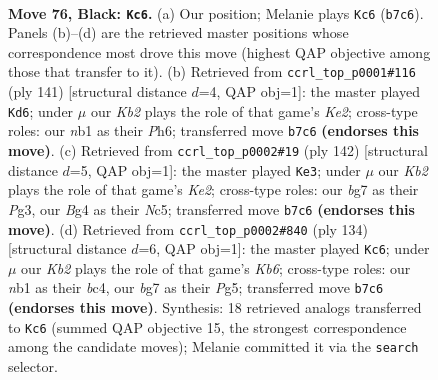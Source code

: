 \documentclass[11pt]{article}
\begin{document}
\clearpage

\begin{figure}[p]\centering
\begin{subfigure}{0.46\textwidth}\centering
\resizebox{\linewidth}{!}{%
\newchessgame
\chessboard[
  setfen={8/1k4B1/8/8/p1p3b1/8/5K2/1N6 b - - 7 76},
  showmover=false,
  pgfstyle=straightmove, color=movearrow, markmove={b7-c6}
]}
\caption{}
\end{subfigure}\hfill
\begin{subfigure}{0.46\textwidth}\centering
\resizebox{\linewidth}{!}{%
\newchessgame
\chessboard[
  setfen={8/4k3/7p/7P/1p2K3/1B6/1b6/8 b - - 0 71},
  showmover=false,
  pgfstyle=straightmove, color=movearrow, markmove={e7-d6}
]}
\caption{}
\end{subfigure}
\\[4pt]
\begin{subfigure}{0.46\textwidth}\centering
\resizebox{\linewidth}{!}{%
\newchessgame
\chessboard[
  setfen={7n/7P/5k2/2N5/6p1/6P1/4K3/8 w - - 11 72},
  showmover=false,
  pgfstyle=straightmove, color=movearrow, markmove={e2-e3}
]}
\caption{}
\end{subfigure}\hfill
\begin{subfigure}{0.46\textwidth}\centering
\resizebox{\linewidth}{!}{%
\newchessgame
\chessboard[
  setfen={5B2/8/1K4p1/6P1/k1b5/8/2P5/8 w - - 11 68},
  showmover=false,
  pgfstyle=straightmove, color=movearrow, markmove={b6-c6}
]}
\caption{}
\end{subfigure}
\caption{\textbf{Move 76, Black: \texttt{Kc6}.} (a) Our position; Melanie plays \texttt{Kc6} (\texttt{b7c6}). Panels (b)--(d) are the retrieved master positions whose correspondence most drove this move (highest QAP objective among those that transfer to it). (b) Retrieved from \texttt{ccrl\_top\_p0001\#116} (ply 141) [structural distance $d$=4, QAP obj=1]: the master played \texttt{Kd6}; under $\mu$ our \emph{Kb2} plays the role of that game's \emph{Ke2}; cross-type roles: our \emph{n}b1 as their \emph{P}h6; transferred move \texttt{b7c6} \textbf{(endorses this move)}. (c) Retrieved from \texttt{ccrl\_top\_p0002\#19} (ply 142) [structural distance $d$=5, QAP obj=1]: the master played \texttt{Ke3}; under $\mu$ our \emph{Kb2} plays the role of that game's \emph{Ke2}; cross-type roles: our \emph{b}g7 as their \emph{P}g3, our \emph{B}g4 as their \emph{N}c5; transferred move \texttt{b7c6} \textbf{(endorses this move)}. (d) Retrieved from \texttt{ccrl\_top\_p0002\#840} (ply 134) [structural distance $d$=6, QAP obj=1]: the master played \texttt{Kc6}; under $\mu$ our \emph{Kb2} plays the role of that game's \emph{Kb6}; cross-type roles: our \emph{n}b1 as their \emph{b}c4, our \emph{b}g7 as their \emph{P}g5; transferred move \texttt{b7c6} \textbf{(endorses this move)}. Synthesis: 18 retrieved analogs transferred to \texttt{Kc6} (summed QAP objective 15, the strongest correspondence among the candidate moves); Melanie committed it via the \texttt{search} selector.}
\label{fig:thought-m151}
\end{figure}
\end{document}

